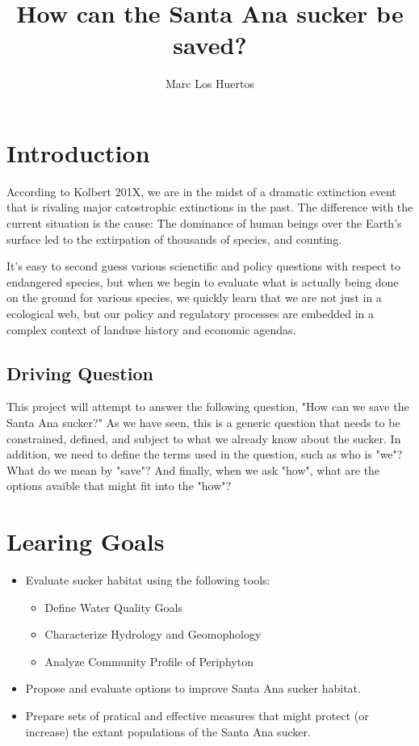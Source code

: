 \documentclass{article}\usepackage[]{graphicx}\usepackage[]{color}
\title{How can the Santa Ana sucker be saved?}
\author{Marc Los Huertos}
\begin{document}
\maketitle

\section{Introduction}

According to Kolbert 201X, we are in the midst of a dramatic extinction event that is rivaling major catostrophic extinctions in the past. The difference with the current situation is the cause: The dominance of human beings over the Earth's surface led to the extirpation of thousands of species, and counting. 

It's easy to second guess various scienctific and policy questions with respect to endangered species, but when we begin to evaluate what is actually being done on the ground for various species, we quickly learn that we are not just in a ecological web, but our policy and regulatory processes are embedded in a complex context of landuse history and economic agendas.  

\subsection{Driving Question}

This project will attempt to answer the following question, "How can we save the Santa Ana sucker?" As we have seen, this is a generic question that needs to be constrained, defined, and subject to what we already know about the sucker. In addition, we need to define the terms used in the question, such as who is "we"? What do we mean by "save"?  And finally, when we ask "how", what are the options avaible that might fit into the "how"?  

\section{Learing Goals}

\begin{itemize}
  \item Evaluate sucker habitat using the following tools:
  \begin{itemize}
    \item Define Water Quality Goals
    \item Characterize Hydrology and Geomophology
    \item Analyze Community Profile of Periphyton
  \end{itemize}
  \item Propose and evaluate options to improve Santa Ana sucker habitat.
  \item Prepare sets of pratical and effective measures that might protect (or increase) the extant populations of the Santa Ana sucker.
\end{itemize}
\end{document}
